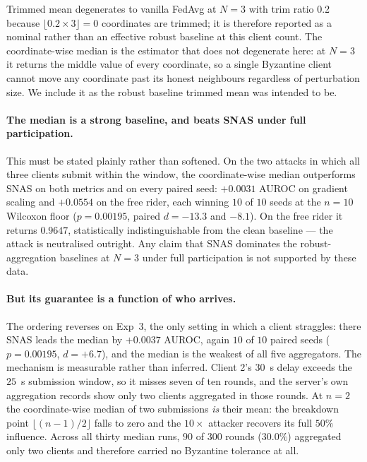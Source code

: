 \documentclass[pdflatex,sn-mathphys-num]{sn-jnl}
\begin{document}
Trimmed mean degenerates to vanilla FedAvg at $N=3$ with trim ratio 0.2 because $\lfloor 0.2\times3\rfloor=0$ coordinates are trimmed; it is therefore reported as a nominal rather than an effective robust baseline at this client count. The coordinate-wise median is the estimator that does not degenerate here: at $N=3$ it returns the middle value of every coordinate, so a single Byzantine client cannot move any coordinate past its honest neighbours regardless of perturbation size. We include it as the robust baseline trimmed mean was intended to be.

\paragraph{The median is a strong baseline, and beats SNAS under full participation.} This must be stated plainly rather than softened. On the two attacks in which all three clients submit within the window, the coordinate-wise median outperforms SNAS on both metrics and on every paired seed: $+0.0031$ AUROC on gradient scaling and $+0.0554$ on the free rider, each winning $10$ of $10$ seeds at the $n=10$ Wilcoxon floor ($p=0.00195$, paired $d=-13.3$ and $-8.1$). On the free rider it returns $0.9647$, statistically indistinguishable from the clean baseline --- the attack is neutralised outright. Any claim that SNAS dominates the robust-aggregation baselines at $N=3$ under full participation is not supported by these data.

\paragraph{But its guarantee is a function of who arrives.} The ordering reverses on Exp~3, the only setting in which a client straggles: there SNAS leads the median by $+0.0037$ AUROC, again $10$ of $10$ paired seeds ($p=0.00195$, $d=+6.7$), and the median is the weakest of all five aggregators. The mechanism is measurable rather than inferred. Client 2's $30$~s delay exceeds the $25$~s submission window, so it misses seven of ten rounds, and the server's own aggregation records show only two clients aggregated in those rounds. At $n=2$ the coordinate-wise median of two submissions \emph{is} their mean: the breakdown point $\lfloor (n-1)/2 \rfloor$ falls to zero and the $10\times$ attacker recovers its full $50\%$ influence. Across all thirty median runs, $90$ of $300$ rounds ($30.0\%$) aggregated only two clients and therefore carried no Byzantine tolerance at all.
\end{document}
